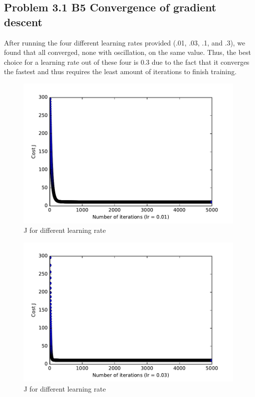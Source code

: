 \documentclass[pdftex,11pt]{article}
\begin{document}
\subsection{Problem 3.1 B5 Convergence of gradient descent}
After running the four different learning rates provided (.01, .03, .1, and .3), we found that all converged, none with oscillation, on the same value. Thus, the best choice for a learning rate out of these four is 0.3 due to the fact that it converges the fastest and thus requires the least amount of iterations to finish training. 
\begin{figure}
  \caption{J for different learning rate}
  \centering
    \includegraphics[scale=1]{fig001.pdf}
\end{figure}
\begin{figure}
  \caption{J for different learning rate}
  \centering
    \includegraphics[scale=1]{fig003.pdf}
\end{figure}
\end{document}
